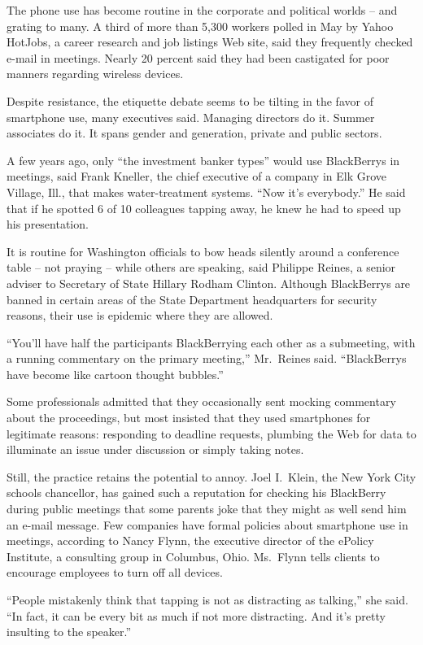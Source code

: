 ﻿\documentclass[12pt,a4paper,onecolumn]{article}
\begin{document}
The phone use has become routine in the corporate and political worlds -- and grating to many. A
third of more than 5,300 workers polled in May by Yahoo HotJobs, a career research and job listings
Web site, said they frequently checked e-mail in meetings. Nearly 20 percent said they had been
castigated for poor manners regarding wireless devices.

Despite resistance, the etiquette debate seems to be tilting in the favor of smartphone use, many
executives said. Managing directors do it. Summer associates do it. It spans gender and generation,
private and public sectors.

A few years ago, only ``the investment banker types'' would use BlackBerrys in meetings, said Frank
Kneller, the chief executive of a company in Elk Grove Village, Ill., that makes water-treatment
systems. ``Now it's everybody.'' He said that if he spotted 6 of 10 colleagues tapping away, he knew
he had to speed up his presentation.

It is routine for Washington officials to bow heads silently around a conference table -- not
praying -- while others are speaking, said Philippe Reines, a senior adviser to Secretary of State
Hillary Rodham Clinton. Although BlackBerrys are banned in certain areas of the State Department
headquarters for security reasons, their use is epidemic where they are allowed.

``You'll have half the participants BlackBerrying each other as a submeeting, with a running
commentary on the primary meeting,'' Mr.~Reines said. ``BlackBerrys have become like cartoon thought
bubbles.''

Some professionals admitted that they occasionally sent mocking commentary about the proceedings,
but most insisted that they used smartphones for legitimate reasons: responding to deadline
requests, plumbing the Web for data to illuminate an issue under discussion or simply taking notes.

Still, the practice retains the potential to annoy. Joel I.~Klein, the New York City schools
chancellor, has gained such a reputation for checking his BlackBerry during public meetings that
some parents joke that they might as well send him an e-mail message. Few companies have formal
policies about smartphone use in meetings, according to Nancy Flynn, the executive director of the
ePolicy Institute, a consulting group in Columbus, Ohio. Ms.~Flynn tells clients to encourage
employees to turn off all devices.

``People mistakenly think that tapping is not as distracting as talking,'' she said. ``In fact, it
can be every bit as much if not more distracting. And it's pretty insulting to the speaker.''
\end{document}

